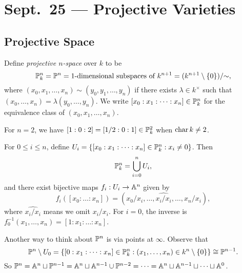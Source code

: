 \chapter{Sept.~25 --- Projective Varieties}

\section{Projective Space}

\begin{definition}
  Define \emph{projective $n$-space} over
  $k$ to be
  \[
    \mathbb{P}^n_k = \mathbb{P}^n
    = \text{1-dimensional subspaces of $k^{n + 1}$}
    = (k^{n + 1} \setminus \{0\}) / {\sim},
  \]
  where $(x_0, x_1, \dots, x_n) \sim (y_0, y_1, \dots, y_n)$
  if there exists $\lambda \in k^\times$
  such that
  $(x_0, \dots, x_n) = \lambda (y_0, \dots, y_n)$.
  We write $[x_0 : x_1 : \dots : x_n] \in \mathbb{P}^n_k$
  for the equivalence class of
  $(x_0, x_1, \dots, x_n)$.
\end{definition}

\begin{example}
  For $n = 2$, we have
  $[1 : 0 : 2] = [1 / 2 : 0 : 1] \in \mathbb{P}^2_k$
  when $\operatorname{char} k \ne 2$.
\end{example}

\begin{remark}
  For $0 \le i \le n$, define
  $U_i = \{[x_0 : x_1 : \dots : x_n] \in \mathbb{P}^n_k : x_i \ne 0\}$.
  Then
  \[
    \mathbb{P}^n_k = \bigcup_{i = 0}^n U_i,
  \]
  and there exist bijective maps
  $f_i : U_i \to \mathbb{A}^n$ given by
  \[
    f_i([x_0 : \dots : x_n])
    = (x_0 / x_i, \dots, \widehat{x_i / x_i}, \dots, x_n / x_i),
  \]
  where $\widehat{x_i / x_i}$ means we omit
  $x_i / x_i$.
  For $i = 0$, the inverse is
  $f_0^{-1}(x_1, \dots, x_n) = [1 : x_1 : \dots : x_n]$.
\end{remark}

\begin{remark}
  Another way to think about $\mathbb{P}^n$ is
  via points at $\infty$. Observe that
  \[
    \mathbb{P}^n \setminus U_0
    = \{[0 : x_1 : \dots : x_n] \in \mathbb{P}^n_k : (x_1, \dots, x_n) \in k^n \setminus \{0\}\}
    \cong \mathbb{P}^{n - 1}.
  \]
  So $\mathbb{P}^n = \mathbb{A}^n \sqcup \mathbb{P}^{n - 1} = \mathbb{A}^n \sqcup \mathbb{A}^{n - 1} \cup \mathbb{P}^{n - 2} = \dots = \mathbb{A}^n \sqcup \mathbb{A}^{n - 1} \sqcup \dots \sqcup \mathbb{A}^0$.
\end{remark}

